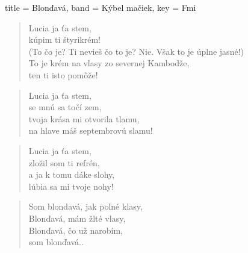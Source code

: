 \begin{song}[
    remember-chords = true ,
    verse/numbered = true ,
    transpose-capo = true 
  ]{
    title = Blonďavá,
    band = Kýbel mačiek,
    key  = Fmi
  }
    \begin{verse}
        Lucia ja ťa stem, \\
        kúpim ti štyrikrém! \\
        (To čo je? Ti nevieš čo to je? Nie. Však to je úplne jasné!) \\
        To je krém na vlasy zo severnej Kambodže, \\
        ten ti isto pomôže! 
    \end{verse}
    
    \begin{chorus}
    \end{chorus}
    
    \begin{verse}
        Lucia ja ťa stem, \\
        se mnú sa točí zem, \\
        tvoja krása mi otvorila tlamu, \\
        na hlave máš septembrovú slamu!
    \end{verse}
    
    \begin{verse}
        Lucia ja ťa stem, \\
        zložil som ti refrén, \\
        a ja k tomu dáke slohy, \\
        lúbia sa mi tvoje nohy!
    \end{verse}
    
    \begin{chorus}
    \end{chorus}
    
    \begin{verse}
        Som blondavá, jak poľné klasy, \\
        Blonďavá, mám žlté vlasy, \\
        Blonďavá, čo už narobím, \\
        som blonďavá..
    \end{verse}
    
\end{song}